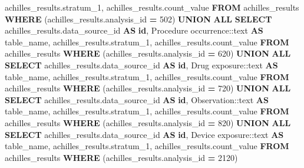\documentclass[
]{book}
\newenvironment{Shaded}{\begin{snugshade}}{\end{snugshade}}
\newcommand{\CharTok}[1]{\textcolor[rgb]{0.31,0.60,0.02}{#1}}
\newcommand{\DecValTok}[1]{\textcolor[rgb]{0.00,0.00,0.81}{#1}}
\newcommand{\KeywordTok}[1]{\textcolor[rgb]{0.13,0.29,0.53}{\textbf{#1}}}
\newcommand{\NormalTok}[1]{#1}
\newcommand{\OperatorTok}[1]{\textcolor[rgb]{0.81,0.36,0.00}{\textbf{#1}}}
\newcommand{\StringTok}[1]{\textcolor[rgb]{0.31,0.60,0.02}{#1}}
\begin{document}
\begin{Shaded}
\begin{Highlighting}[]
\NormalTok{           achilles\_results.stratum\_1,}
\NormalTok{           achilles\_results.count\_value}
          \KeywordTok{FROM}\NormalTok{ achilles\_results}
         \KeywordTok{WHERE}\NormalTok{ (achilles\_results.analysis\_id }\OperatorTok{=} \DecValTok{502}\NormalTok{)}
       \KeywordTok{UNION} \KeywordTok{ALL}
        \KeywordTok{SELECT}\NormalTok{ achilles\_results.data\_source\_id }\KeywordTok{AS} \KeywordTok{id}\NormalTok{,}
           \StringTok{\textquotesingle{}Procedure occurrence\textquotesingle{}}\NormalTok{:}\CharTok{:text} \KeywordTok{AS}\NormalTok{ table\_name,}
\NormalTok{           achilles\_results.stratum\_1,}
\NormalTok{           achilles\_results.count\_value}
          \KeywordTok{FROM}\NormalTok{ achilles\_results}
         \KeywordTok{WHERE}\NormalTok{ (achilles\_results.analysis\_id }\OperatorTok{=} \DecValTok{620}\NormalTok{)}
       \KeywordTok{UNION} \KeywordTok{ALL}
        \KeywordTok{SELECT}\NormalTok{ achilles\_results.data\_source\_id }\KeywordTok{AS} \KeywordTok{id}\NormalTok{,}
           \StringTok{\textquotesingle{}Drug exposure\textquotesingle{}}\NormalTok{:}\CharTok{:text} \KeywordTok{AS}\NormalTok{ table\_name,}
\NormalTok{           achilles\_results.stratum\_1,}
\NormalTok{           achilles\_results.count\_value}
          \KeywordTok{FROM}\NormalTok{ achilles\_results}
         \KeywordTok{WHERE}\NormalTok{ (achilles\_results.analysis\_id }\OperatorTok{=} \DecValTok{720}\NormalTok{)}
       \KeywordTok{UNION} \KeywordTok{ALL}
        \KeywordTok{SELECT}\NormalTok{ achilles\_results.data\_source\_id }\KeywordTok{AS} \KeywordTok{id}\NormalTok{,}
           \StringTok{\textquotesingle{}Observation\textquotesingle{}}\NormalTok{:}\CharTok{:text} \KeywordTok{AS}\NormalTok{ table\_name,}
\NormalTok{           achilles\_results.stratum\_1,}
\NormalTok{           achilles\_results.count\_value}
          \KeywordTok{FROM}\NormalTok{ achilles\_results}
         \KeywordTok{WHERE}\NormalTok{ (achilles\_results.analysis\_id }\OperatorTok{=} \DecValTok{820}\NormalTok{)}
       \KeywordTok{UNION} \KeywordTok{ALL}
        \KeywordTok{SELECT}\NormalTok{ achilles\_results.data\_source\_id }\KeywordTok{AS} \KeywordTok{id}\NormalTok{,}
           \StringTok{\textquotesingle{}Device exposure\textquotesingle{}}\NormalTok{:}\CharTok{:text} \KeywordTok{AS}\NormalTok{ table\_name,}
\NormalTok{           achilles\_results.stratum\_1,}
\NormalTok{           achilles\_results.count\_value}
          \KeywordTok{FROM}\NormalTok{ achilles\_results}
         \KeywordTok{WHERE}\NormalTok{ (achilles\_results.analysis\_id }\OperatorTok{=} \DecValTok{2120}\NormalTok{)}

\end{Highlighting}
\end{Shaded}
\end{document}
